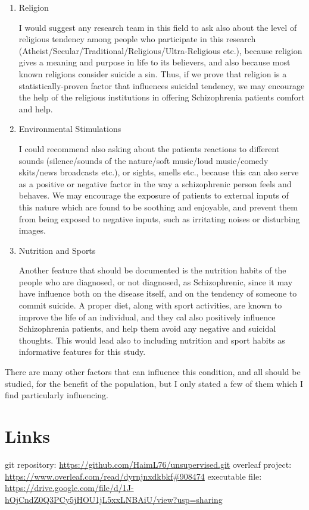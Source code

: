 \documentclass{article}
\begin{document}
\begin{enumerate}
    \item Religion

    I would suggest any research team in this field to ask also about the level of religious tendency among people who participate in this research (Atheist/Secular/Traditional/Religious/Ultra-Religious etc.), because religion gives a meaning and purpose in life to its believers, and also because most known religions consider suicide a sin. Thus, if we prove that religion is a statistically-proven factor that influences suicidal tendency, we may encourage the help of the religious institutions in offering Schizophrenia patients comfort and help.

    \item Environmental Stimulations

    I could recommend also asking about the patients reactions to different sounds (silence/sounds of the nature/soft music/loud music/comedy skits/news broadcasts etc.), or sights, smells etc., because this can also serve as a positive or negative factor in the way a schizophrenic person feels and behaves. We may encourage the exposure of patients to external inputs of this nature which are found to be soothing and enjoyable, and prevent them from being exposed to negative inputs, such as irritating noises or disturbing images.

    \item Nutrition and Sports

    Another feature that should be documented is the nutrition habits of the people who are diagnosed, or not diagnosed, as Schizophrenic, since it may have influence both on the disease itself, and on the tendency of someone to commit suicide. A proper diet, along with sport activities, are known to improve the life of an individual, and they cal also positively influence Schizophrenia patients, and help them avoid any negative and suicidal thoughts. This would lead also to including nutrition and sport habits as informative features for this study.
\end{enumerate}

There are many other factors that can influence this condition, and all should be studied, for the benefit of the population, but I only stated a few of them which I find particularly influencing.

\section{Links}
git repository: \url{https://github.com/HaimL76/unsupervised.git}\newline
overleaf project: \url{https://www.overleaf.com/read/dyrnjnxdkbkf#908474}\newline
executable file: \url{https://drive.google.com/file/d/1J-hOjCndZ0Q3PCy5jHOU1jL5xxLNBAiU/view?usp=sharing}
\end{document}

